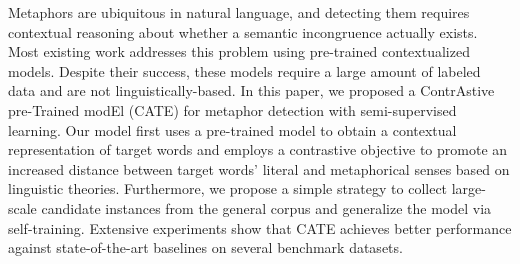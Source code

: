 Metaphors are ubiquitous in natural language, and detecting them requires contextual reasoning about whether a semantic incongruence actually exists. Most existing work addresses this problem using pre-trained contextualized models. Despite their success, these models require a large amount of labeled data and are not linguistically-based. In this paper, we proposed a ContrAstive pre-Trained modEl (CATE) for metaphor detection with semi-supervised learning. Our model first uses a pre-trained model to obtain a contextual representation of target words and employs a contrastive objective to promote an increased distance between target words' literal and metaphorical senses based on linguistic theories. Furthermore, we propose a simple strategy to collect large-scale candidate instances from the general corpus and generalize the model via self-training. Extensive experiments show that CATE achieves better performance against state-of-the-art baselines on several benchmark datasets.
